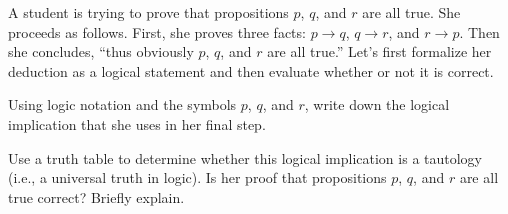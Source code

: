 \documentclass[twoside,12pt]{article}
\begin{document}
\begin{problem}{14} A student is trying to prove that propositions $p$, $q$, and $r$ are
all true.  She proceeds as follows.  First, she proves three facts: $p
\rightarrow q$, $q \rightarrow r$, and $r
\rightarrow p$.  Then she concludes, ``thus obviously $p$, $q$, and
$r$ are all true.''  Let's first formalize her deduction as a logical
statement and then evaluate whether or not it is correct.


\bparts
{} Using logic notation and the symbols $p$, $q$, and $r$,
write down the logical implication that she uses in her final step.


 Use a truth table to determine whether this logical
implication is a tautology (i.e., a universal truth in logic).
 Is her proof that propositions $p$, $q$, and $r$ are all
true correct?  Briefly explain.


\eparts
\end{problem}
\end{document}
